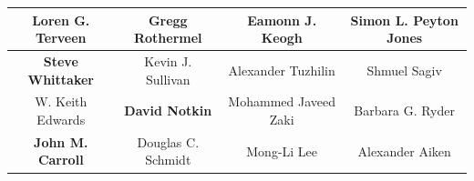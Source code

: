 \begin{table}[!hptb]
{\begin{tabular}{|c|c|c|c|}
Loren G. Terveen & Gregg Rothermel & Eamonn J. Keogh & Simon L. Peyton Jones\\ \hline
\textbf{Steve Whittaker} & Kevin J. Sullivan & Alexander Tuzhilin & Shmuel Sagiv\\ \hline
W. Keith Edwards & \textbf{David Notkin} & Mohammed Javeed Zaki & Barbara G. Ryder\\ \hline
\textbf{John M. Carroll} & Douglas C. Schmidt & Mong-Li Lee & Alexander Aiken\\ \hline
\end{tabular}
}
\end{table}


